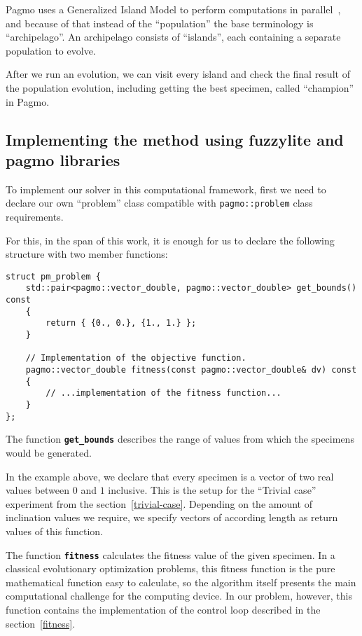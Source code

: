 \documentclass[12pt, a4paper]{article}
\begin{document}
	Pagmo uses a Generalized Island Model to perform computations in parallel~\cite{Izzo2012}, and because of that instead of the ``population'' the base terminology is ``archipelago''.
	An archipelago consists of ``islands'', each containing a separate population to evolve.
	
	After we run an evolution, we can visit every island and check the final result of the population evolution, including getting the best specimen, called ``champion'' in Pagmo.
	
	\subsection{Implementing the method using fuzzylite and pagmo libraries}
	
	To implement our solver in this computational framework, first we need to declare our own ``problem'' class compatible with \texttt{pagmo::problem} class requirements.
	
	For this, in the span of this work, it is enough for us to declare the following structure with two member functions:
	
	\begin{lstlisting}[language={[11]c++}]
struct pm_problem {
	std::pair<pagmo::vector_double, pagmo::vector_double> get_bounds() const
	{
		return { {0., 0.}, {1., 1.} };
	}
	
	// Implementation of the objective function.
	pagmo::vector_double fitness(const pagmo::vector_double& dv) const
	{
		// ...implementation of the fitness function...
	}
};
	\end{lstlisting}
	
	The function \textbf{\texttt{get\_bounds}} describes the range of values from which the specimens would be generated.
	
	In the example above, we declare that every specimen is a vector of two real values between $0$ and $1$ inclusive.
	This is the setup for the ``Trivial case'' experiment from the section~\ref{trivial-case}.
	Depending on the amount of inclination values we require, we specify vectors of according length as return values of this function.
	
	The function \textbf{\texttt{fitness}} calculates the fitness value of the given specimen.
	In a classical evolutionary optimization problems, this fitness function is the pure mathematical function easy to calculate, so the algorithm itself presents the main computational challenge for the computing device.
	In our problem, however, this function contains the implementation of the control loop described in the section~\ref{fitness}.
	
\end{document}
